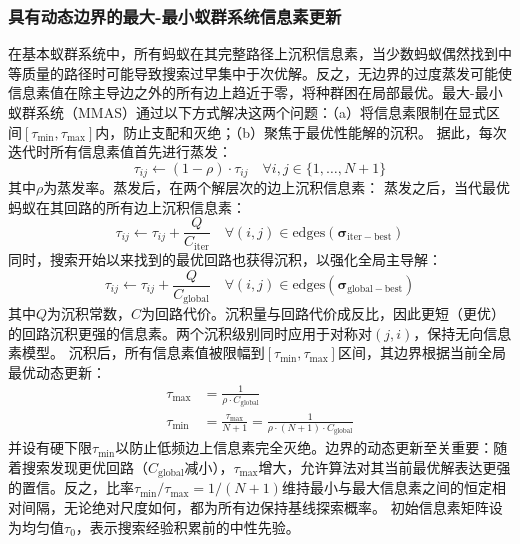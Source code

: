 \documentclass[lettersize,journal]{IEEEtran}
\begin{document}
\subsubsection{具有动态边界的最大-最小蚁群系统信息素更新}
在基本蚁群系统中，所有蚂蚁在其完整路径上沉积信息素，当少数蚂蚁偶然找到中等质量的路径时可能导致搜索过早集中于次优解。反之，无边界的过度蒸发可能使信息素值在除主导边之外的所有边上趋近于零，将种群困在局部最优。最大-最小蚁群系统（MMAS）\cite{ref23}通过以下方式解决这两个问题：（a）将信息素限制在显式区间$[\tau_{\min}, \tau_{\max}]$内，防止支配和灭绝；（b）聚焦于最优性能解的沉积。
据此，每次迭代时所有信息素值首先进行蒸发：
\begin{equation}
\tau_{ij} \leftarrow (1 - \rho) \cdot \tau_{ij} \quad \forall i, j \in \{1, \dots, N+1\}
\label{eq:evap}
\end{equation}
其中$\rho$为蒸发率。蒸发后，在两个解层次的边上沉积信息素：
蒸发之后，当代最优蚂蚁在其回路的所有边上沉积信息素：
\begin{equation}
\tau_{ij} \leftarrow \tau_{ij} + \frac{Q}{C_{\mathrm{iter}}} \quad \forall (i, j) \in \mathrm{edges}(\bm{\sigma}_{\mathrm{iter-best}})
\label{eq:deposititer}
\end{equation}
同时，搜索开始以来找到的最优回路也获得沉积，以强化全局主导解：
\begin{equation}
\tau_{ij} \leftarrow \tau_{ij} + \frac{Q}{C_{\mathrm{global}}} \quad \forall (i, j) \in \mathrm{edges}(\bm{\sigma}_{\mathrm{global-best}})
\label{eq:depositglob}
\end{equation}
其中$Q$为沉积常数，$C$为回路代价。沉积量与回路代价成反比，因此更短（更优）的回路沉积更强的信息素。两个沉积级别同时应用于对称对$(j, i)$，保持无向信息素模型。
沉积后，所有信息素值被限幅到$[\tau_{\min}, \tau_{\max}]$区间，其边界根据当前全局最优动态更新：
\begin{align}
\tau_{\max} &= \frac{1}{\rho \cdot C_{\mathrm{global}}}
\label{eq:taumax}\\
\tau_{\min} &= \frac{\tau_{\max}}{N+1} = \frac{1}{\rho \cdot (N+1) \cdot C_{\mathrm{global}}}
\label{eq:taumin}
\end{align}
并设有硬下限$\tau_{\min}$以防止低频边上信息素完全灭绝。边界的动态更新至关重要：随着搜索发现更优回路（$C_{\mathrm{global}}$减小），$\tau_{\max}$增大，允许算法对其当前最优解表达更强的置信。反之，比率$\tau_{\min}/\tau_{\max} = 1/(N+1)$维持最小与最大信息素之间的恒定相对间隔，无论绝对尺度如何，都为所有边保持基线探索概率。
初始信息素矩阵设为均匀值$\tau_0$，表示搜索经验积累前的中性先验。
\end{document}
